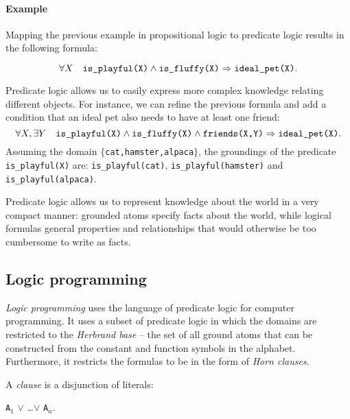 \paragraph{Example} Mapping the previous example in propositional logic to predicate logic results in the following formula:

$$\forall X \quad \text{\texttt{is\_playful(X)}} \wedge \text{\texttt{is\_fluffy(X)}} \Rightarrow \text{\texttt{ideal\_pet(X)}}. $$

 Predicate logic allows us to easily express more complex knowledge relating different objects.
 For instance, we can refine the previous formula and add a condition that an ideal pet also needs to have at least one friend:
 $$\forall X, \exists Y \quad \text{\texttt{is\_playful(X)}} \wedge \text{\texttt{is\_fluffy(X)}} \wedge \text{\texttt{friends(X,Y)}} \Rightarrow \text{\texttt{ideal\_pet(X)}}. $$
 Assuming the domain $\{$\texttt{cat,hamster,alpaca}$\}$, the groundings of the predicate \texttt{is\_playful(X)} are: \texttt{is\_playful(cat)}, \texttt{is\_playful(hamster)} and \texttt{is\_playful(alpaca)}.




 Predicate logic allows us to represent knowledge about the world in a very compact manner: grounded atoms specify facts about the world, while logical formulas general properties and relationships that would otherwise be too cumbersome to write as facts.










\subsection{Logic programming}


\textit{Logic programming} uses the language of predicate logic for computer programming.
It uses a subset of predicate logic in which the domains are restricted to the \textit{Herbrand base} -- the set of all ground atoms that can be constructed from the constant and function symbols in the alphabet.
Furthermore, it restricts the formulas to be in the form of \textit{Horn clauses}.


A \textit{clause} is a disjunction of literals:

\begin{center}
	\texttt{A}$_1$  $\vee$ \ldots $\vee$ \texttt{A}$_n$.
\end{center}

